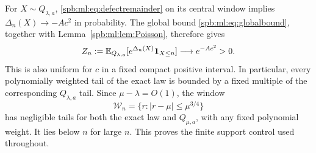 For $X\sim Q_{\lambda,a}$, \eqref{spb:ml:eq:defectremainder} on its central window implies $\Delta_n(X)\to-Ac^2$ in probability. The global bound \eqref{spb:ml:eq:globalbound}, together with Lemma~\ref{spb:ml:lem:Poisson}, therefore gives
\begin{equation}\label{spb:ml:eq:normlimit}
 Z_n:=\mathbb E_{Q_{\lambda,a}}[e^{\Delta_n(X)}\mathbf 1_{X\le n}]
 \longrightarrow e^{-Ac^2}>0.
\end{equation}
This is also uniform for $c$ in a fixed compact positive interval. In particular, every polynomially weighted tail of the exact law is bounded by a fixed multiple of the corresponding $Q_{\lambda,a}$ tail. Since $\mu-\lambda=O(1)$, the window
\begin{equation}\label{spb:ml:eq:window}
 \mathcal W_n=\{r:|r-\mu|\le\mu^{3/4}\}
\end{equation}
has negligible tails for both the exact law and $Q_{\mu,a}$, with any fixed polynomial weight. It lies below $n$ for large $n$. This proves the finite support control used throughout.
